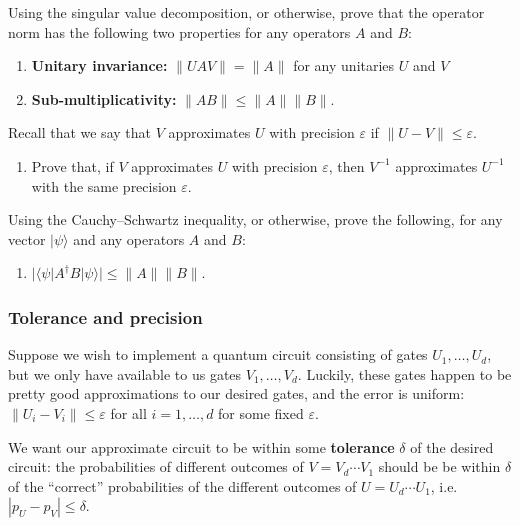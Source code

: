 \documentclass[fleqn]{article}
\providecommand{\tightlist}{%
  \setlength{\itemsep}{0pt}\setlength{\parskip}{0pt}}
\renewcommand{\footnote}[1]{\en{#1}}
\begin{document}
Using the singular value decomposition\footnote{Recall Section \ref{the-schmidt-decomposition}}, or otherwise, prove that the operator norm has the following two properties for any operators \(A\) and \(B\):

\begin{enumerate}
\def\labelenumi{\arabic{enumi}.}
\setcounter{enumi}{4}
\tightlist
\item
  \textbf{Unitary invariance:} \(\|UAV\|=\|A\|\) for any unitaries \(U\) and \(V\)
\item
  \textbf{Sub-multiplicativity:} \(\|AB\|\leqslant\|A\|\|B\|\).
\end{enumerate}

Recall that we say that \(V\) approximates \(U\) with precision \(\varepsilon\) if \(\|U-V\|\leqslant\varepsilon\).

\begin{enumerate}
\def\labelenumi{\arabic{enumi}.}
\setcounter{enumi}{6}
\tightlist
\item
  Prove that, if \(V\) approximates \(U\) with precision \(\varepsilon\), then \(V^{-1}\) approximates \(U^{-1}\) with the same precision \(\varepsilon\).
\end{enumerate}

Using the Cauchy--Schwartz inequality, or otherwise, prove the following, for any vector \(|\psi\rangle\) and any operators \(A\) and \(B\):

\begin{enumerate}
\def\labelenumi{\arabic{enumi}.}
\setcounter{enumi}{7}
\tightlist
\item
  \(|\langle\psi|A^\dagger B|\psi\rangle|\leqslant\|A\|\|B\|\).
\end{enumerate}

\hypertarget{tolerance-and-precision}{%
\subsubsection{Tolerance and precision}\label{tolerance-and-precision}}

Suppose we wish to implement a quantum circuit consisting of gates \(U_1,\ldots,U_d\), but we only have available to us gates \(V_1,\ldots,V_d\).
Luckily, these gates happen to be pretty good approximations to our desired gates, and the error is uniform: \(\|U_i-V_i\|\leqslant\varepsilon\) for all \(i=1,\ldots,d\) for some fixed \(\varepsilon\).

We want our approximate circuit to be within some \textbf{tolerance} \(\delta\) of the desired circuit: the probabilities of different outcomes of \(V=V_d\cdots V_1\) should be be within \(\delta\) of the ``correct'' probabilities of the different outcomes of \(U=U_d\cdots U_1\), i.e.~\(|p_U-p_V|\leqslant\delta\).
\end{document}
